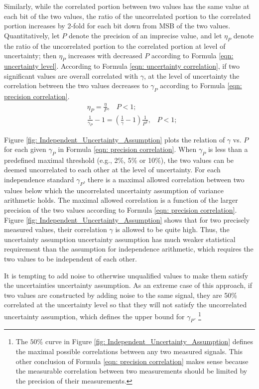 \documentclass[twoside]{article}
\numberwithin{equation}{section}
\newcommand{\eqspace}{\;\;\;}
\begin{document}
Similarly, while the correlated portion between two values has the same value at each bit of the two values, the ratio of the uncorrelated portion to the correlated portion increases by 2-fold for each bit down from MSB of the two values. 
Quantitatively, let $P$ denote the precision of an imprecise value, and let $\eta_{P}$ denote the ratio of the uncorrelated portion to the correlated portion at level of uncertainty; then $\eta_{P}$ increases with decreased $P$ according to Formula \eqref{eqn: uncertainty level}. 
According to Formula \eqref{eqn: uncertainty correlation}, if two significant values are overall correlated with $\gamma$, at the level of uncertainty the correlation between the two values decreases to $\gamma_P$ according to Formula \eqref{eqn: precision correlation}.
\begin{align}
\label{eqn: uncertainty level}
& \eta_{P} = \frac{\eta}{P}, \eqspace P < 1; \\
\label{eqn: precision correlation}
& \frac{1}{\gamma_{P}} - 1 = \left(\frac{1}{\gamma} -1\right) \frac{1}{P^2}, \eqspace P < 1;
\end{align}

Figure \ref{fig: Independent_Uncertainty_Assumption} plots the relation of $\gamma$ vs. $P$ for each given $\gamma_{P}$ in Formula \eqref{eqn: precision correlation}.  
When $\gamma_{P}$ is less than a predefined maximal threshold (e.g., 2\%, 5\% or 10\%), the two values can be deemed uncorrelated to each other at the level of uncertainty.  
For each independence standard $\gamma_{P}$, there is a maximal allowed correlation between two values below which the uncorrelated uncertainty assumption of variance arithmetic holds.  
The maximal allowed correlation is a function of the larger precision of the two values according to Formula \eqref{eqn: precision correlation}.  
Figure \ref{fig: Independent_Uncertainty_Assumption} shows that for two precisely measured values, their correlation $\gamma$ is allowed to be quite high.  
Thus, the uncertainty assumption uncertainty assumption has much weaker statistical requirement than the assumption for independence arithmetic, which requires the two values to be independent of each other.

It is tempting to add noise to otherwise unqualified values to make them satisfy the uncertainties uncertainty assumption.  
As an extreme case of this approach, if two values are constructed by adding noise to the same signal, they are 50\% correlated at the uncertainty level so that they will not satisfy the uncorrelated uncertainty assumption, which defines the upper bound for $\gamma_{P}$. 
\footnote{
The $50\%$ curve in Figure \ref{fig: Independent_Uncertainty_Assumption} defines the maximal possible correlations between any two measured signals. 
This other conclusion of Formula \eqref{eqn: precision correlation} makes sense because the measurable correlation between two measurements should be limited by the precision of their measurements.
}
\end{document}

